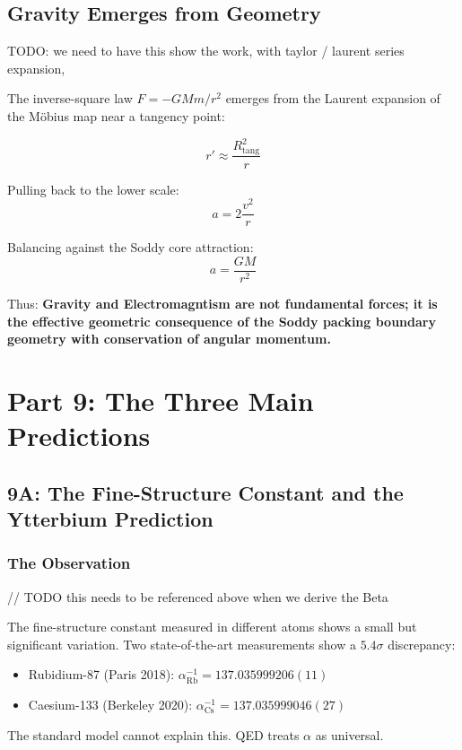 \documentclass[11pt,a4paper]{article}
\begin{document}
\subsection{Gravity Emerges from Geometry}

TODO: we need to have this show the work, with taylor / laurent series expansion, 

The inverse-square law $F = -GMm/r^2$ emerges from the Laurent expansion of the Möbius map near a tangency point:

\[
r' \approx \frac{R_{\text{tang}}^2}{r}
\]

Pulling back to the lower scale:
\[
a = 2\frac{v^2}{r}
\]

Balancing against the Soddy core attraction:
\[
a = \frac{GM}{r^2}
\]

Thus: \textbf{Gravity and Electromagntism are not fundamental forces; it is the effective geometric consequence of the Soddy packing boundary geometry with conservation of angular momentum.}

\section{Part 9: The Three Main Predictions}

\subsection{9A: The Fine-Structure Constant and the Ytterbium Prediction}

\subsubsection{The Observation}

// TODO this needs to be referenced above when we derive the Beta

The fine-structure constant measured in different atoms shows a small but significant variation. Two state-of-the-art measurements show a $5.4\sigma$ discrepancy:

\begin{itemize}
\item Rubidium-87 (Paris 2018): $\alpha^{-1}_\mathrm{Rb} = 137.035999206(11)$
\item Caesium-133 (Berkeley 2020): $\alpha^{-1}_\mathrm{Cs} = 137.035999046(27)$
\end{itemize}

The standard model cannot explain this. QED treats $\alpha$ as universal.
\end{document}
